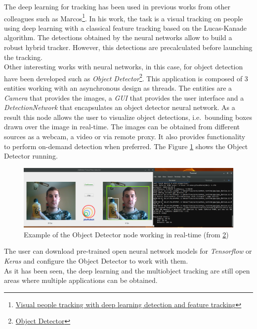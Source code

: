 The deep learning for tracking has been used in previous works from other colleagues such as Marcos\footnote{\href{https://gsyc.urjc.es/jmplaza/students/tfm-visualtracking-marcos_pieras-2017.pdf}{Visual people tracking with deep learning
detection and feature tracking}}. In his work, the task is a visual tracking on people using deep learning with a classical feature tracking based on the Lucas-Kanade algorithm. The detections obtained by the neural networks allow to build a robust hybrid tracker. However, this detections are precalculated before launching the tracking.\\
Other interesting works with neural networks, in this case, for object detection have been developed such as \textit{Object Detector}\footnote {\label{object_detector}\href{https://github.com/JdeRobot/dl-objectdetector}{Object Detector}}.
This application is composed of 3 entities working with an asynchronous design as threads. The entities are a \textit{Camera} that provides the images, a \textit{GUI} that provides the user interface and a \textit{DetectionNetwork} that encapsulates an object detector neural network. As a result this node allows the user to visualize object detections, i.e.\ bounding boxes drawn over the image in real-time. The images can be obtained from different sources as a webcam, a video or via remote proxy. It also provides functionality to perform on-demand detection when preferred. The Figure \ref{fig:object_detector} shows the Object Detector running.
\begin{figure}[H]
\begin{center}
\includegraphics[scale=0.25]{figures/object_detector.png}
\caption{Example of the Object Detector node working in real-time (from \ref{object_detector})}
\label{fig:object_detector}
\end{center}
\end{figure}
The user can download pre-trained open neural network models for \textit{Tensorflow} or \textit{Keras} and configure the Object Detector to work with them.\\
As it has been seen, the deep learning and the multiobject tracking are still open areas where multiple applications can be obtained.\\
